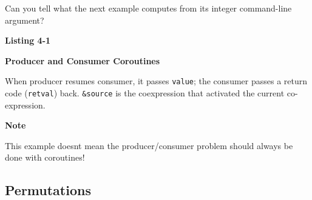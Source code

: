 \bigskip

\noindent
Can you tell what the next example computes from its integer
command-line argument?

\bigskip

{\sffamily\bfseries
Listing 4-1}

{\sffamily\bfseries
Producer and Consumer Coroutines}


When producer resumes consumer, it passes \texttt{value}; the consumer
passes a return code (\texttt{retval}) back. \texttt{\&source} is the
coexpression that activated the current co-expression.

{\sffamily\bfseries
Note}

{\sffamily
This example doesn{\textquotesingle}t mean the producer/consumer problem
should always be done with coroutines!}

\subsection[Permutations]{Permutations}

